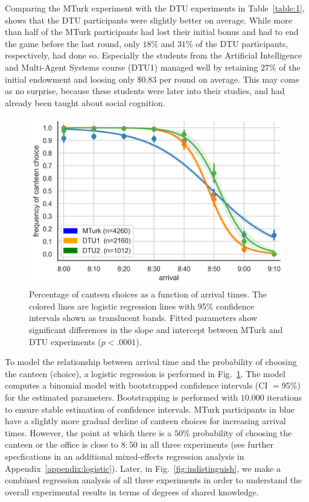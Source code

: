 \documentclass[twocolumn,a4paper,superscriptaddress,nofootinbib]{revtex4}
\begin{document}
Comparing the MTurk experiment with the DTU experiments in Table~\ref{table:1}, shows that the DTU participants were slightly better on average. While more than half of the MTurk participants had lost their initial bonus and had to end the game before the last round, only $18\%$ and $31\%$ of the DTU participants, respectively, had done so. Especially the students from the Artificial Intelligence and Multi-Agent Systems course (DTU1) managed well by retaining $27\%$ of the initial endowment and loosing only $\$0.83$ per round on average. This may come as no surprise, because these students were later into their studies, and had already been taught about social cognition.

\begin{figure} %
	\centering\includegraphics[width=0.8\linewidth]{fig1.png}
	\caption{Percentage of canteen choices as a function of arrival times. The colored lines are logistic regression lines with 95\% confidence intervals shown as translucent bands. Fitted parameters show significant differences in the slope and intercept between MTurk and DTU experiments ($p < .0001$).}
	\label{fig:1}
\end{figure}

To model the relationship between arrival time and the probability of choosing the canteen (choice), a logistic regression is performed in Fig.~\ref{fig:1}. The model computes a binomial model with bootstrapped confidence intervals (CI $=95\%$) for the estimated parameters. Bootstrapping is performed with $10.000$ iterations to ensure stable estimation of confidence intervals. MTurk participants in blue have a slightly more gradual decline of canteen choices for increasing arrival times. However, the point at which there is a $50\%$ probability of choosing the canteen or the office is close to $8{:}50$ in all three experiments (see further specfications in an additional mixed-effects regression analysis in Appendix~\ref{appendix:logistic}). Later, in Fig.~\ref{fig:indistinguish}, we make a combined regression analysis of all three experiments in order to understand the overall experimental results in terms of degrees of shared knowledge.
\end{document}
